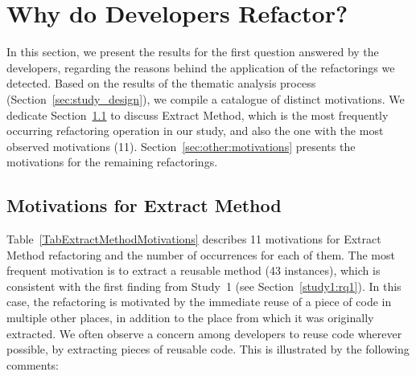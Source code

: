 \section{Why do Developers Refactor?}

\begin{table}[htb]
\centering
\renewcommand{\arraystretch}{1.2}
\caption{{\textsc Extract Method} motivations}
\label{TabExtractMethodMotivations}
\footnotesize 

\end{table}

In this section, we present the results for the first question answered by the developers, regarding the reasons behind 
the application of the refactorings we detected. Based on the results of the thematic analysis process (Section~\ref{sec:study_design}), we compile a catalogue of \totalMotivationThemes distinct motivations.
We dedicate Section~\ref{SecExtractMethodMotivations} to discuss {\textsc Extract Method}, which is the most frequently 
occurring refactoring operation in our study, and also the one with the most observed motivations (11). 
Section~\ref{sec:other:motivations} presents the motivations for the remaining refactorings.


\subsection{Motivations for Extract Method}
\label{SecExtractMethodMotivations}
\begin{table}[htbp]
\centering
\renewcommand{\arraystretch}{1.2}
\caption{Motivations for {\textsc Move Class, Attribute, Method (MC, MA, MM)}, {\textsc Rename Package (RP)} {\textsc Inline Method (IM)}, {\textsc Extract Superclass, Interface (ES, EI)}, {\textsc Pull Up Method, Attribute (PUM, PUA)}, {\textsc Push Down Attribute, Method (PDA, PDM)} }
\label{TabOtherMotivations}
\footnotesize
\resizebox{\linewidth}{!}{

}
\end{table}


Table~\ref{TabExtractMethodMotivations} describes 11 motivations for {\textsc Extract Method} refactoring and the number of occurrences for each of them. 
The most frequent motivation is to extract a reusable method (43 instances), which is consistent with the first finding from Study~1 (see Section~\ref{study1:rq1}).
In this case, the refactoring is motivated by the immediate reuse of a piece of code
in multiple other places, in addition to the place from which it was originally extracted.
We often observe a concern among developers to reuse code wherever possible, by extracting pieces of reusable code.
This is illustrated by the following comments:\margin

